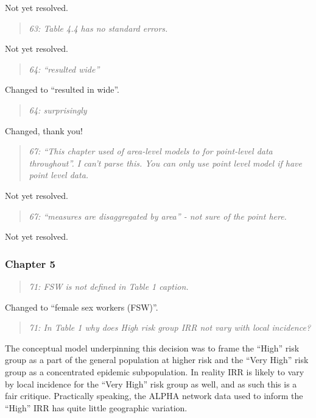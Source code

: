 \documentclass[
  12pt,
]{article}
\begin{document}
Not yet resolved.

\begin{quote}
\emph{63: Table 4.4 has no standard errors.}
\end{quote}

Not yet resolved.

\begin{quote}
\emph{64: ``resulted wide''}
\end{quote}

Changed to ``resulted in wide''.

\begin{quote}
\emph{64: surprisingly}
\end{quote}

Changed, thank you!

\begin{quote}
\emph{67: ``This chapter used of area-level models to for point-level
data throughout''. I can't parse this. You can only use point level
model if have point level data.}
\end{quote}

Not yet resolved.

\begin{quote}
\emph{67: ``measures are disaggregated by area'' - not sure of the point
here.}
\end{quote}

Not yet resolved.

\subsubsection{Chapter 5}\label{chapter-5-1}

\begin{quote}
\emph{71: FSW is not defined in Table 1 caption.}
\end{quote}

Changed to ``female sex workers (FSW)''.

\begin{quote}
\emph{71: In Table 1 why does High risk group IRR not vary with local
incidence?}
\end{quote}

The conceptual model underpinning this decision was to frame the
``High'' risk group as a part of the general population at higher risk
and the ``Very High'' risk group as a concentrated epidemic
subpopulation. In reality IRR is likely to vary by local incidence for
the ``Very High'' risk group as well, and as such this is a fair
critique. Practically speaking, the ALPHA network data used to inform
the ``High'' IRR has quite little geographic variation.
\end{document}
